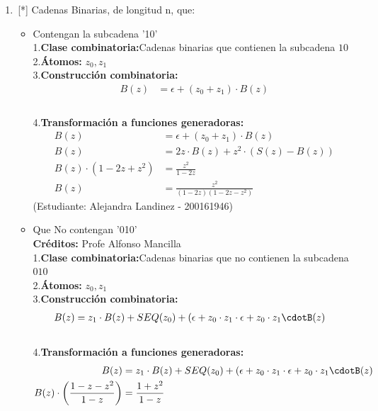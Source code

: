 \begin{enumerate}
    \item \,[*] Cadenas Binarias, de longitud n, que:
    \begin{itemize}
        \item Contengan la subcadena '10'\\
        1.\textbf{Clase combinatoria:}Cadenas binarias que contienen la subcadena $10$\\
        2.\textbf{Átomos:} $z_0, z_1$\\
        3.\textbf{Construcción combinatoria:}\\
        \begin{align*}
            B(z) &= \epsilon + (z_0+z_1)\cdot B(z)\\
        \end{align*}\\
        4.\textbf{Transformación a funciones generadoras:}
        \begin{align*}
            B(z) &= \epsilon + (z_0+z_1)\cdot B(z)\\
            B(z) &= 2z\cdot B(z)+z^2\cdot (S(z)-B(z))\\
            B(z)\cdot (1-2z+z^2) &= \frac{z^2}{1-2z}\\
            B(z) &= \frac{z^2}{(1-2z)(1-2z-z^2)}
        \end{align*}
        (Estudiante: Alejandra Landinez - 200161946)\\
        \item Que No contengan '010'\\
        \textbf{Créditos:} Profe Alfonso Mancilla\\
        1.\textbf{Clase combinatoria:}Cadenas binarias que no contienen la subcadena $010$\\
        2.\textbf{Átomos:} $z_0, z_1$\\
        3.\textbf{Construcción combinatoria:}\\
        \begin{align*}
            B(z) &= z_1\cdot B(z)+SEQ(z_0)+(\epsilon+z_0\cdot z_1\cdot \epsilon +z_0\cdot z_1\cdotB(z)
        \end{align*}\\
        4.\textbf{Transformación a funciones generadoras:}\\
        \begin{align*}
            B(z) &= z_1\cdot B(z)+SEQ(z_0)+(\epsilon+z_0\cdot z_1\cdot \epsilon +z_0\cdot z_1\cdotB(z)\\
            B(z)\cdot \left(\frac{1-z-z^2}{1-z}\right)&= \frac{1+z^2}{1-z}\\

\end{align*}
\end{itemize}
\end{enumerate}
